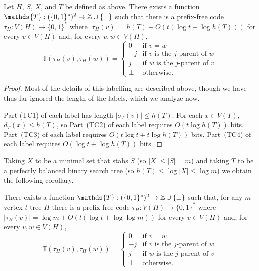 \documentclass[kpfonts]{patmorin}
\begin{document}
\begin{lem}
  Let $H$, $S$, $X$, and $T$ be defined as above.  There exists a function $\mathds{T}:(\{0,1\}^*)^2\to \Z\cup\{\perp\}$ such that there is a prefix-free code $\tau_H:V(H)\to\{0,1\}^*$ where $|\tau_H(v)|=h(T) + O(t(\log t + \log h(T)))$ for every $v\in V(H)$ and, for every $v,w\in V(H)$, 
  \[
      \mathds{T}(\tau_H(v),\tau_H(w)) = \begin{cases}
      0 & \text{if $v=w$} \\
      -j & \text{if $v$ is the $j$-parent of $w$} \\
      j & \text{if $w$ is the $j$-parent of $v$} \\
      \perp & \text{otherwise.}
    \end{cases}
  \]
\end{lem}

\begin{proof}
  Most of the details of this labelling are described above, though we have thus far ignored the length of the labels, which we analyze now.
  
  Part (TC1) of each label has length $|\sigma_T(v)|\le h(T)$.  For each $x\in V(T)$, $d_T(x)\le h(T)$, so Part~(TC2) of each label requires $O(t\log h(T))$ bits.  Part~(TC3) of each label requires $O(t\log t + t\log h(T))$ bits.  Part~(TC4) of each label requires $O(\log t + \log h(T))$ bits.
\end{proof}

Taking $X$ to be a minimal set that stabs $S$ (so $|X|\le |S|=m$) and taking $T$ to be a perfectly balanced binary search tree (so $h(T)\le \log|X|\le\log m$) we obtain the following corollary.

\begin{cor}
  There exists a function $\mathds{T}:(\{0,1\}^*)^2\to \Z\cup\{\perp\}$ such that, for any $m$-vertex $t$-tree $H$ there is a prefix-free code $\tau_H:V(H)\to\{0,1\}^*$ where $|\tau_H(v)|=\log m + O(t(\log t + \log\log m))$ for every $v\in V(H)$ and, for every $v,w\in V(H)$, 
  \[
      \mathds{T}(\tau_H(v),\tau_H(w)) = \begin{cases}
      0 & \text{if $v=w$} \\
      -j & \text{if $v$ is the $j$-parent of $w$} \\
      j & \text{if $w$ is the $j$-parent of $v$} \\
      \perp & \text{otherwise.}
    \end{cases}
  \]
\end{cor}
\end{document}
